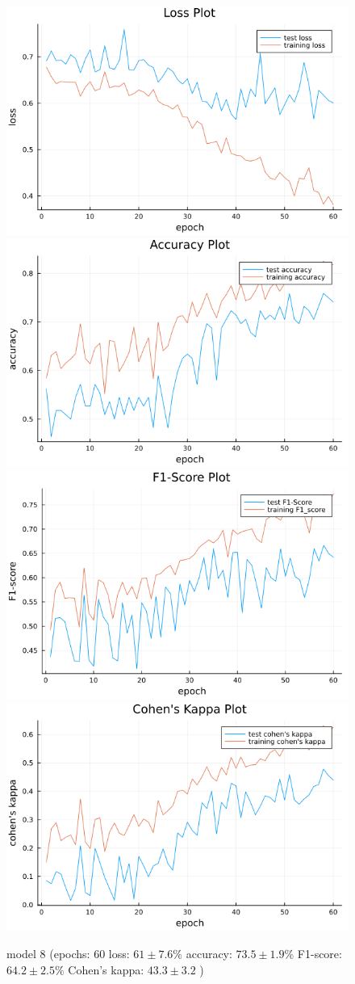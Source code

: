 \documentclass[
a4paper, 
12pt,
grayscalebody, %
abstract=on,
twoside, BCOR10mm, 12pt, DIV13,headinclude, footexclude, final, abstracton, openright
]{ibireprt}
\numberwithin{equation}{chapter}
\numberwithin{table}{chapter}
\numberwithin{figure}{chapter}
\numberwithin{algorithm}{chapter}
\numberwithin{example}{chapter}
\numberwithin{example}{chapter}
\begin{document}
\begin{figure}[h]
	\includegraphics[width=0.4\linewidth]{loss_png_final_2_4.png}\hfill
	\includegraphics[width=0.4\linewidth]{accuracy_png_final_2_4.png}
	\\[\smallskipamount]
	\includegraphics[width=0.4\linewidth]{f1_score_png_final_2_4.png}\hfill
	\includegraphics[width=0.4\linewidth]{cohens_kappa_png_final_2_4.png}
	\caption{model 8 (epochs: 60 loss: $61\pm7.6\% $ accuracy: $73.5\pm1.9\%$ F1-score: $64.2\pm2.5\%$  Cohen's kappa: $43.3\pm3.2$ )}
	\label{fig:model_8_60}
\end{figure}
\end{document}
